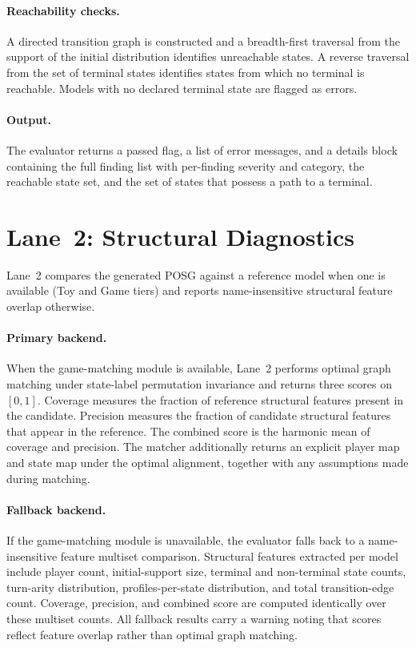 \documentclass{article}
\begin{document}
\paragraph{Reachability checks.}
A directed transition graph is constructed and a breadth-first traversal from
the support of the initial distribution identifies unreachable states. A
reverse traversal from the set of terminal states identifies states from which
no terminal is reachable. Models with no declared terminal state are flagged
as errors.

\paragraph{Output.}
The evaluator returns a passed flag, a list of error messages, and a details
block containing the full finding list with per-finding severity and category,
the reachable state set, and the set of states that possess a path to a
terminal.

\section{Lane~2: Structural Diagnostics}
\label{sec:lane2_details}

Lane~2 compares the generated POSG against a reference model when one is
available (Toy and Game tiers) and reports name-insensitive structural feature
overlap otherwise.

\paragraph{Primary backend.}
When the game-matching module is available, Lane~2 performs optimal graph
matching under state-label permutation invariance and returns three scores on
$[0,1]$. Coverage measures the fraction of reference structural features
present in the candidate. Precision measures the fraction of candidate
structural features that appear in the reference. The combined score is the
harmonic mean of coverage and precision. The matcher additionally returns an
explicit player map and state map under the optimal alignment, together with
any assumptions made during matching.

\paragraph{Fallback backend.}
If the game-matching module is unavailable, the evaluator falls back to a
name-insensitive feature multiset comparison. Structural features extracted
per model include player count, initial-support size, terminal and non-terminal
state counts, turn-arity distribution, profiles-per-state distribution, and
total transition-edge count. Coverage, precision, and combined score are
computed identically over these multiset counts. All fallback results carry a
warning noting that scores reflect feature overlap rather than optimal graph
matching.
\end{document}
